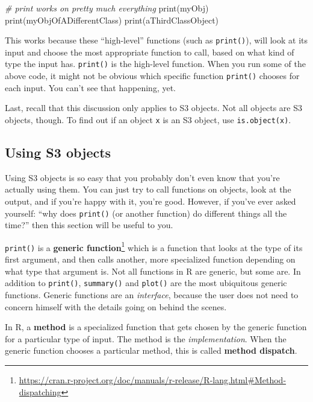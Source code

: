 \documentclass[
  12pt,
  krantz2]{krantz}
\makeatletter
\newenvironment{Shaded}{\begin{snugshade}}{\end{snugshade}}
\newcommand{\CommentTok}[1]{\textcolor[rgb]{0.37,0.37,0.37}{\textit{#1}}}
\newcommand{\FunctionTok}[1]{\textcolor[rgb]{0,0,0}{#1}}
\newcommand{\NormalTok}[1]{#1}
\renewcommand{\href}[2]{#2\footnote{\url{#1}}}
\newenvironment{kframe}{%
\medskip{}
\setlength{\fboxsep}{.8em}
 \def\at@end@of@kframe{}%
 \ifinner\ifhmode%
  \def\at@end@of@kframe{\end{minipage}}%
  \begin{minipage}{\columnwidth}%
 \fi\fi%
 \def\FrameCommand##1{\hskip\@totalleftmargin \hskip-\fboxsep
 \colorbox{shadecolor}{##1}\hskip-\fboxsep
     \hskip-\linewidth \hskip-\@totalleftmargin \hskip\columnwidth}%
 \MakeFramed {\advance\hsize-\width
   \@totalleftmargin\z@ \linewidth\hsize
   \@setminipage}}%
 {\par\unskip\endMakeFramed%
 \at@end@of@kframe}
\renewenvironment{Shaded}{\begin{kframe}}{\end{kframe}}
\makeatother
\begin{document}
\begin{Shaded}
\begin{Highlighting}[]
\CommentTok{\# print works on pretty much everything}
\FunctionTok{print}\NormalTok{(myObj)}
\FunctionTok{print}\NormalTok{(myObjOfADifferentClass)}
\FunctionTok{print}\NormalTok{(aThirdClassObject)}
\end{Highlighting}
\end{Shaded}

This works because these ``high-level'' functions (such as \texttt{print()}), will look at its input and choose the most appropriate function to call, based on what kind of type the input has. \texttt{print()} is the high-level function. When you run some of the above code, it might not be obvious which specific function \texttt{print()} chooses for each input. You can't see that happening, yet.

Last, recall that this discussion only applies to S3 objects. Not all objects are S3 objects, though. To find out if an object \texttt{x} is an S3 object, use \texttt{is.object(x)}.

\hypertarget{using-s3-objects}{%
\subsection{Using S3 objects}\label{using-s3-objects}}

Using S3 objects is so easy that you probably don't even know that you're actually using them. You can just try to call functions on objects, look at the output, and if you're happy with it, you're good. However, if you've ever asked yourself: ``why does \texttt{print()} (or another function) do different things all the time?'' then this section will be useful to you.

\texttt{print()} is a \href{https://cran.r-project.org/doc/manuals/r-release/R-lang.html\#Method-dispatching}{\textbf{generic function}} which is a function that looks at the type of its first argument, and then calls another, more specialized function depending on what type that argument is. Not all functions in R are generic, but some are. In addition to \texttt{print()}, \texttt{summary()} and \texttt{plot()} are the most ubiquitous generic functions. Generic functions are an \emph{interface}, because the user does not need to concern himself with the details going on behind the scenes.

In R, a \textbf{method} is a specialized function that gets chosen by the generic function for a particular type of input. The method is the \emph{implementation}. When the generic function chooses a particular method, this is called \textbf{method dispatch}.
\end{document}
